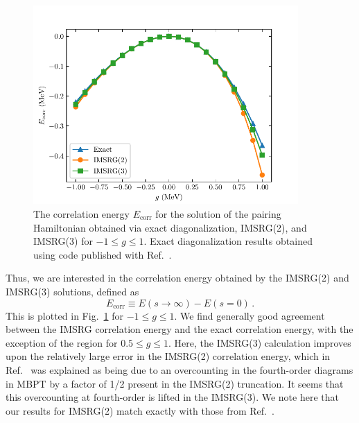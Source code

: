 \begin{figure}[t]
    \centering
    \includegraphics[width=0.9\textwidth]{thesis/doc/images/pairing_ham_imsrg3.pdf}
    \caption[
        The correlation energy $E_{\text{corr}}$ for the solution of the pairing Hamiltonian
        obtained via exact diagonalization,
        IMSRG(2), and IMSRG(3)
        for $-1 \le g \le 1$.
    ]{
        The correlation energy $E_{\text{corr}}$ for the solution of the pairing Hamiltonian
        obtained via exact diagonalization,
        IMSRG(2), and IMSRG(3)
        for $-1 \le g \le 1$.
        Exact diagonalization results obtained using code published with Ref.~\cite{Liet16lecnotesphysics}.
    }\label{fig:pairing_hamiltonian_fig}
\end{figure}

Thus, we are interested in the correlation energy obtained by the IMSRG(2) and IMSRG(3) solutions,
defined as
\begin{equation}
    E_{\text{corr}} \equiv E(s \rightarrow \infty) - E(s= 0)\,.
\end{equation}
This is plotted in Fig.~\ref{fig:pairing_hamiltonian_fig} for $-1 \le g \le 1$.
We find generally good agreement between the IMSRG correlation energy
and the exact correlation energy,
with the exception of the region for $0.5 \le g \le 1$.
Here, the IMSRG(3) calculation improves upon the relatively large error in the IMSRG(2)
correlation energy,
which in Ref.~\cite{Herg16imsrglecnotes}
was explained as being due to an overcounting in the fourth-order diagrams in MBPT
by a factor of 1/2 present in the IMSRG(2) truncation.
It seems that this overcounting at fourth-order is lifted in the IMSRG(3).
We note here that our results for IMSRG(2) match exactly with those from Ref.~\cite{Herg16imsrglecnotes}.
